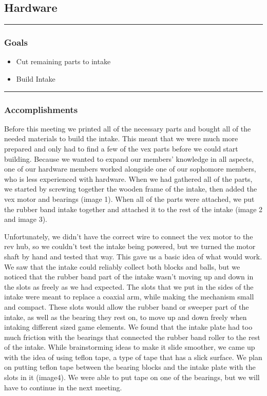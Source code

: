 \subsection*{Hardware}
\noindent\hfil\rule{\textwidth}{.4pt}\hfil
\subsubsection*{Goals}
\begin{itemize}
    \item Cut remaining parts to intake
    \item Build Intake 

\end{itemize} 

\noindent\hfil\rule{\textwidth}{.4pt}\hfil

\subsubsection*{Accomplishments}
Before this meeting we printed all of the necessary parts and bought all of the needed materials to build the intake. This meant that we were much more prepared and only had to find a few of the vex parts before we could start building. Because we wanted to expand our members’ knowledge in all aspects, one of our hardware members worked alongside one of our sophomore members, who is less experienced with hardware. When we had gathered all of the parts, we started by screwing together the wooden frame of the intake, then added the vex motor and bearings (image 1). When all of the parts were attached, we put the rubber band intake together and attached it to the rest of the intake (image 2 and image 3). 

Unfortunately, we didn't have the correct wire to connect the vex motor to the rev hub, so we couldn’t test the intake being powered, but we turned the motor shaft by hand and tested that way. This gave us a basic idea of what would work. We saw that the intake could reliably collect both blocks and balls, but we noticed that the rubber band part of the intake wasn’t moving up and down in the slots as freely as we had expected. The slots that we put in the sides of the intake were meant to replace a coaxial arm, while making the mechanism small and compact. These slots would allow the rubber band or sweeper part of the intake, as well as the bearing they rest on, to move up and down freely when intaking different sized game elements. We found that the intake plate  had too much friction with the bearings that connected the rubber band roller to the rest of the intake. While brainstorming ideas to make it slide smoother, we came up with the idea of using teflon tape, a type of tape that has a slick surface. We plan on putting teflon tape between the bearing blocks and the intake plate with the slots in it (image4). We were able to put tape on one of the bearings, but we will have to continue in the next meeting. 


